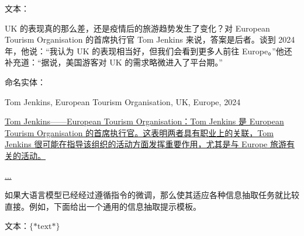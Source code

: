 \vspace{0.5em}
\begin{tcolorbox}

\begingroup
\setlength{\leftskip}{2em}
\setlength{\rightskip}{2em}


\vspace{0.7em}

文本：

UK 的表现真的那么差，还是疫情后的旅游趋势发生了变化？对 European Tourism Organisation 的首席执行官 Tom Jenkins 来说，答案是后者。谈到 2024 年，他说：“我认为 UK 的表现相当好，但我们会看到更多人前往 Europe。”他还补充道：“据说，美国游客对 UK 的需求略微进入了平台期。”

\vspace{0.7em}

命名实体：

Tom Jenkins, European Tourism Organisation, UK, Europe, 2024

\vspace{0.7em}

\uline{Tom Jenkins——European Tourism Organisation：Tom Jenkins 是 European Tourism Organisation 的首席执行官。这表明两者具有职业上的关联，Tom Jenkins 很可能在指导该组织的活动方面发挥重要作用，尤其是与 Europe 旅游有关的活动。}

\vspace{0.3em}

\uline{...}

\endgroup

\end{tcolorbox}
\vspace{0.5em}

如果大语言模型已经经过遵循指令的微调，那么使其适应各种信息抽取任务就比较直接。例如，下面给出一个通用的信息抽取提示模板。

\vspace{0.5em}
\begin{tcolorbox}

\begingroup
\setlength{\leftskip}{2em}
\setlength{\rightskip}{2em}


\vspace{0.7em}

文本：$\{*\mathrm{text}*\}$

\vspace{0.7em}

\underline{\hspace{2em}}

\endgroup

\end{tcolorbox}
\vspace{0.5em}

